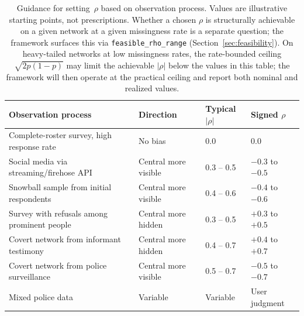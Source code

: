 \documentclass[11pt]{article}
\begin{document}
\begin{table}[h]
\centering
\small
\begin{tabular}{p{5.5cm} p{3.5cm} p{1.8cm} p{1.8cm}}
\toprule
\textbf{Observation process} & \textbf{Direction} & \textbf{Typical $|\rho|$} & \textbf{Signed $\rho$} \\
\midrule
Complete-roster survey, high response rate & No bias & 0.0 & 0.0 \\
Social media via streaming/firehose API & Central more visible & 0.3 -- 0.5 & $-0.3$ to $-0.5$ \\
Snowball sample from initial respondents & Central more visible & 0.4 -- 0.6 & $-0.4$ to $-0.6$ \\
Survey with refusals among prominent people & Central more hidden & 0.3 -- 0.5 & $+0.3$ to $+0.5$ \\
Covert network from informant testimony & Central more hidden & 0.4 -- 0.7 & $+0.4$ to $+0.7$ \\
Covert network from police surveillance & Central more visible & 0.5 -- 0.7 & $-0.5$ to $-0.7$ \\
Mixed police data & Variable & Variable & User judgment \\
\bottomrule
\end{tabular}
\caption{Guidance for setting~$\rho$ based on observation process. Values are illustrative starting points, not prescriptions. Whether a chosen $\rho$ is structurally achievable on a given network at a given missingness rate is a separate question; the framework surfaces this via \texttt{feasible\_rho\_range} (Section~\ref{sec:feasibility}). On heavy-tailed networks at low missingness rates, the rate-bounded ceiling $\sqrt{2 p (1-p)}$ may limit the achievable $|\rho|$ below the values in this table; the framework will then operate at the practical ceiling and report both nominal and realized values.}
\label{tab:rho-guidance}
\end{table}
\end{document}
